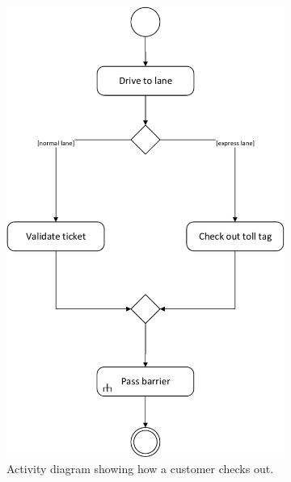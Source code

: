\begin{figure}[H]
	\centering
	\begin{subfigure}[b]{0.675\textwidth}
	\includegraphics[width=\textwidth]{img/activity_diagrams/Check_Out}
	\caption{Activity diagram showing how a customer checks out.}
	\end{subfigure}
	~
	\begin{subfigure}[b]{0.225\textwidth}

\end{subfigure}
\end{figure}

